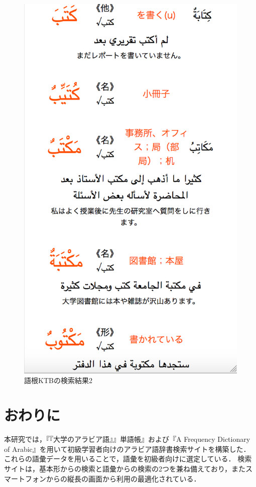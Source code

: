 \documentclass[technicalreport]{ieicej}
\begin{document}
\begin{figure}[H]
\begin{minipage}{0.5\hsize}
\begin{center}
   \includegraphics[scale=0.3]{fig04.png}
  \end{center}
  \caption{語根KTBの検索結果2}
 \end{minipage}
\end{figure}

\section{おわりに}
本研究では，『『大学のアラビア語』』単語帳』および『A Frequency Dictionary of Arabic』を用いて初級学習者向けのアラビア語辞書検索サイトを構築した．
これらの語彙データを用いることで，語彙を初級者向けに選定している．
検索サイトは，基本形からの検索と語彙からの検索の2つを兼ね備えており，またスマートフォンからの縦長の画面から利用の最適化されている．
\end{document}
